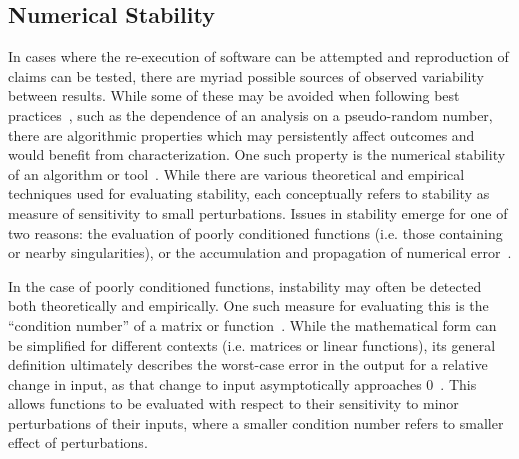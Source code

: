 \subsection{Numerical Stability}
\label{sec:bg_stab}
In cases where the re-execution of software can be attempted and reproduction of claims can be tested, there are myriad
possible sources of observed variability between results. While some of these may be avoided when following best
practices~\cite{prlic2012ten}, such as the dependence of an analysis on a pseudo-random number, there are algorithmic
properties which may persistently affect outcomes and would benefit from characterization. One such property is the
numerical stability of an algorithm or tool~\cite{higham2002accuracy}. While there are various theoretical and empirical
techniques used for evaluating stability, each conceptually refers to stability as measure of sensitivity to small
perturbations. Issues in stability emerge for one of two reasons: the evaluation of poorly conditioned functions (i.e.
those containing or nearby singularities), or the accumulation and propagation of numerical error~\cite{higham2002accuracy}.

In the case of poorly conditioned functions, instability may often be detected both theoretically and empirically. One
such measure for evaluating this is the ``condition number'' of a matrix or function~\cite{belsley2005regression}. While
the mathematical form can be simplified for different contexts (i.e. matrices or linear functions), its general
definition ultimately describes the worst-case error in the output for a relative change in input, as that change to input
asymptotically approaches $0$~\cite{belsley2005regression}. This allows functions to be evaluated with respect to
their sensitivity to minor perturbations of their inputs, where a smaller condition number refers to smaller effect of
perturbations.


